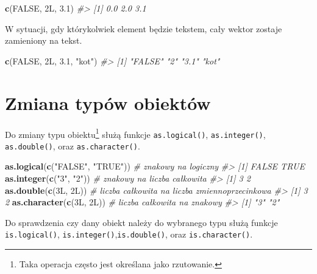 \documentclass[paper=6in:9in,pagesize=pdftex,headinclude=on,footinclude=on,10pt]{scrbook}
\newenvironment{Shaded}{\begin{snugshade}}{\end{snugshade}}
\newcommand{\CommentTok}[1]{\textcolor[rgb]{0.56,0.35,0.01}{\textit{#1}}}
\newcommand{\FloatTok}[1]{\textcolor[rgb]{0.00,0.00,0.81}{#1}}
\newcommand{\KeywordTok}[1]{\textcolor[rgb]{0.13,0.29,0.53}{\textbf{#1}}}
\newcommand{\NormalTok}[1]{#1}
\newcommand{\OtherTok}[1]{\textcolor[rgb]{0.56,0.35,0.01}{#1}}
\newcommand{\StringTok}[1]{\textcolor[rgb]{0.31,0.60,0.02}{#1}}
\begin{document}
\begin{Shaded}
\begin{Highlighting}[]
\KeywordTok{c}\NormalTok{(}\OtherTok{FALSE}\NormalTok{, 2L, }\FloatTok{3.1}\NormalTok{)}
\CommentTok{#> [1] 0.0 2.0 3.1}
\end{Highlighting}
\end{Shaded}

W sytuacji, gdy którykolwiek element będzie tekstem, cały wektor zostaje zamieniony na tekst.

\begin{Shaded}
\begin{Highlighting}[]
\KeywordTok{c}\NormalTok{(}\OtherTok{FALSE}\NormalTok{, 2L, }\FloatTok{3.1}\NormalTok{, }\StringTok{"kot"}\NormalTok{)}
\CommentTok{#> [1] "FALSE" "2"     "3.1"   "kot"}
\end{Highlighting}
\end{Shaded}

\hypertarget{zmiana-typow-obiektow}{%
\section{Zmiana typów obiektów}\label{zmiana-typow-obiektow}}

Do zmiany typu obiektu\footnote{Taka operacja często jest określana jako rzutowanie.} służą funkcje \texttt{as.logical()}, \texttt{as.integer()}, \texttt{as.double()}, oraz \texttt{as.character()}.

\begin{Shaded}
\begin{Highlighting}[]
\KeywordTok{as.logical}\NormalTok{(}\KeywordTok{c}\NormalTok{(}\StringTok{"FALSE"}\NormalTok{, }\StringTok{"TRUE"}\NormalTok{)) }\CommentTok{# znakowy na logiczny}
\CommentTok{#> [1] FALSE  TRUE}
\KeywordTok{as.integer}\NormalTok{(}\KeywordTok{c}\NormalTok{(}\StringTok{"3"}\NormalTok{, }\StringTok{"2"}\NormalTok{)) }\CommentTok{# znakowy na liczba całkowita }
\CommentTok{#> [1] 3 2}
\KeywordTok{as.double}\NormalTok{(}\KeywordTok{c}\NormalTok{(3L, 2L)) }\CommentTok{# liczba całkowita na liczba zmiennoprzecinkowa}
\CommentTok{#> [1] 3 2}
\KeywordTok{as.character}\NormalTok{(}\KeywordTok{c}\NormalTok{(3L, 2L)) }\CommentTok{# liczba całkowita na znakowy}
\CommentTok{#> [1] "3" "2"}
\end{Highlighting}
\end{Shaded}

Do sprawdzenia czy dany obiekt należy do wybranego typu służą funkcje \texttt{is.logical()}, \texttt{is.integer()},\texttt{is.double()}, oraz \texttt{is.character()}.
\end{document}
